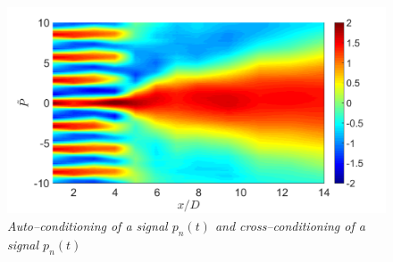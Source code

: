 \begin{figure}
	\centering
	\includegraphics[width=1\textwidth]{Figures/conditioning/autoCondSt0p35.png}
	\caption{\textit{Auto--conditioning of a signal $p_n(t)$ and cross--conditioning of a signal $p_n(t)$}}
	\label{fig:autoCondSt0p35}
\end{figure}
